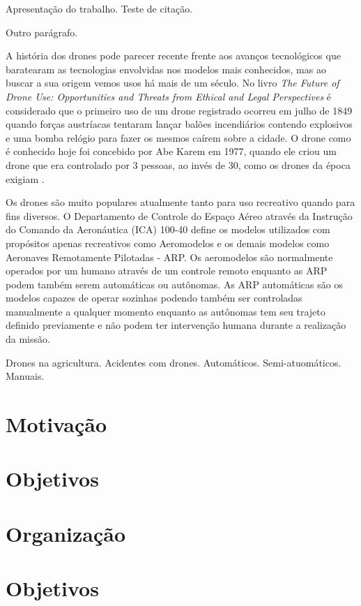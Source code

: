 
Apresentação do trabalho. Teste de citação. \cite{Sousa2017}

Outro parágrafo.

A história dos drones pode parecer recente frente aos avanços tecnológicos que baratearam as tecnologias envolvidas nos modelos mais conhecidos, mas ao buscar a sua origem vemos usos há mais de um século. No livro \textit{The Future of Drone Use: Opportunities and Threats from Ethical and Legal Perspectives} \cite{Custers2016} é considerado que o primeiro uso de um drone registrado ocorreu em julho de 1849 quando forças austríacas tentaram lançar balões incendiários contendo explosivos e uma bomba relógio para fazer os mesmos caírem sobre a cidade. O drone como é conhecido hoje foi concebido por Abe Karem em 1977, quando ele criou um drone que era controlado por 3 pessoas, ao invés de 30, como os drones da época exigiam \cite{Buzzo2015}.

Os drones são muito populares atualmente tanto para uso recreativo quando para fins diversos. O Departamento de Controle do Espaço Aéreo através da Instrução do Comando da Aeronáutica (ICA) 100-40 define os modelos utilizados com propósitos apenas recreativos como Aeromodelos e os demais modelos como Aeronaves Remotamente Pilotadas - ARP. Os aeromodelos são normalmente operados por um humano através de um controle remoto enquanto as ARP podem também serem automáticas ou autônomas. As ARP automáticas são os modelos capazes de operar sozinhas podendo também ser controladas manualmente a qualquer momento enquanto as autônomas tem seu trajeto definido previamente e não podem ter intervenção humana durante a realização da missão. \cite{CEA2018}



Drones na agricultura.
Acidentes com drones.
Automáticos.
Semi-atuomáticos.
Manuais.

\section{Motivação}
\section{Objetivos}
\section{Organização}
\section{Objetivos}
